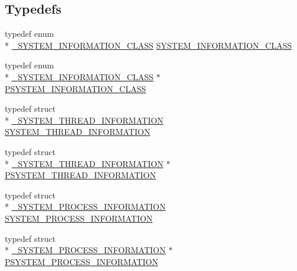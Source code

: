 \subsection*{Typedefs}
\begin{DoxyCompactItemize}
\item 
typedef enum \\*
\hyperlink{ntquerysysteminformation_8h_ad5d815b48e8f4da1ef2eb7a2f18a54e0}{\-\_\-\-S\-Y\-S\-T\-E\-M\-\_\-\-I\-N\-F\-O\-R\-M\-A\-T\-I\-O\-N\-\_\-\-C\-L\-A\-S\-S} \hyperlink{ntquerysysteminformation_8h_a6f4391292f166b482e5b633f423436d7}{S\-Y\-S\-T\-E\-M\-\_\-\-I\-N\-F\-O\-R\-M\-A\-T\-I\-O\-N\-\_\-\-C\-L\-A\-S\-S}
\item 
typedef enum \\*
\hyperlink{ntquerysysteminformation_8h_ad5d815b48e8f4da1ef2eb7a2f18a54e0}{\-\_\-\-S\-Y\-S\-T\-E\-M\-\_\-\-I\-N\-F\-O\-R\-M\-A\-T\-I\-O\-N\-\_\-\-C\-L\-A\-S\-S} $\ast$ \hyperlink{ntquerysysteminformation_8h_a3530723d505458cdf3975de4262e1f4e}{P\-S\-Y\-S\-T\-E\-M\-\_\-\-I\-N\-F\-O\-R\-M\-A\-T\-I\-O\-N\-\_\-\-C\-L\-A\-S\-S}
\item 
typedef struct \\*
\hyperlink{struct___s_y_s_t_e_m___t_h_r_e_a_d___i_n_f_o_r_m_a_t_i_o_n}{\-\_\-\-S\-Y\-S\-T\-E\-M\-\_\-\-T\-H\-R\-E\-A\-D\-\_\-\-I\-N\-F\-O\-R\-M\-A\-T\-I\-O\-N} \hyperlink{ntquerysysteminformation_8h_aebfabca4c73f455f630fd90a8ac71b70}{S\-Y\-S\-T\-E\-M\-\_\-\-T\-H\-R\-E\-A\-D\-\_\-\-I\-N\-F\-O\-R\-M\-A\-T\-I\-O\-N}
\item 
typedef struct \\*
\hyperlink{struct___s_y_s_t_e_m___t_h_r_e_a_d___i_n_f_o_r_m_a_t_i_o_n}{\-\_\-\-S\-Y\-S\-T\-E\-M\-\_\-\-T\-H\-R\-E\-A\-D\-\_\-\-I\-N\-F\-O\-R\-M\-A\-T\-I\-O\-N} $\ast$ \hyperlink{ntquerysysteminformation_8h_a35facd08b7311378579d1dc57999bbb4}{P\-S\-Y\-S\-T\-E\-M\-\_\-\-T\-H\-R\-E\-A\-D\-\_\-\-I\-N\-F\-O\-R\-M\-A\-T\-I\-O\-N}
\item 
typedef struct \\*
\hyperlink{struct___s_y_s_t_e_m___p_r_o_c_e_s_s___i_n_f_o_r_m_a_t_i_o_n}{\-\_\-\-S\-Y\-S\-T\-E\-M\-\_\-\-P\-R\-O\-C\-E\-S\-S\-\_\-\-I\-N\-F\-O\-R\-M\-A\-T\-I\-O\-N} \hyperlink{ntquerysysteminformation_8h_aa35cdb5a4946532ca3985925c85057d7}{S\-Y\-S\-T\-E\-M\-\_\-\-P\-R\-O\-C\-E\-S\-S\-\_\-\-I\-N\-F\-O\-R\-M\-A\-T\-I\-O\-N}
\item 
typedef struct \\*
\hyperlink{struct___s_y_s_t_e_m___p_r_o_c_e_s_s___i_n_f_o_r_m_a_t_i_o_n}{\-\_\-\-S\-Y\-S\-T\-E\-M\-\_\-\-P\-R\-O\-C\-E\-S\-S\-\_\-\-I\-N\-F\-O\-R\-M\-A\-T\-I\-O\-N} $\ast$ \hyperlink{ntquerysysteminformation_8h_ac3b1a5ae7b10b0bfb24f24f87b87ac2b}{P\-S\-Y\-S\-T\-E\-M\-\_\-\-P\-R\-O\-C\-E\-S\-S\-\_\-\-I\-N\-F\-O\-R\-M\-A\-T\-I\-O\-N}

\end{DoxyCompactItemize}
